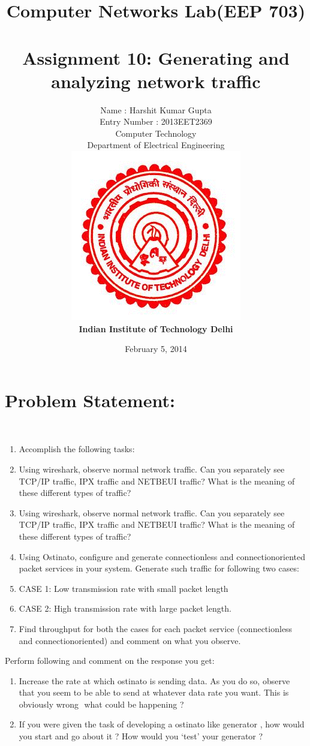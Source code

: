 \documentclass[a4paper,12pt,oneside]{article}
\title{\bf \LARGE {Computer Networks Lab(EEP 703)\\
\\[0.5cm]  Assignment 10: Generating and analyzing network traffic}}
\author{Name : Harshit Kumar Gupta \\Entry Number : 2013EET2369
\\[0.5cm]Computer Technology \\Department of Electrical Engineering
\\[0.5cm]\includegraphics[scale=.5]{./IITD.png}
\\[2cm]\bf \LARGE{Indian Institute of Technology Delhi}}
\date{February 5, 2014}
\begin{document}
\maketitle
\newpage
\tableofcontents






\newpage

 \section{Problem Statement:}


\\[.25cm]
\begin{enumerate}
\item Accomplish the following tasks:
\item Using wireshark, observe normal network traffic. Can you separately see TCP/IP traffic, 
IPX traffic and NETBEUI traffic? What is the meaning of these different types of traffic? 
\item Using wireshark, observe normal network traffic. Can you separately see TCP/IP traffic, 
IPX traffic and NETBEUI traffic? What is the meaning of these different types of traffic? 
\item Using Ostinato, configure and generate connectionless and connection­oriented packet services 
in your system. Generate such traffic for following two cases: 
\item CASE 1: Low transmission rate with small packet length  
\item CASE 2: High transmission rate with large packet length.
\item Find throughput for both the cases for each packet service (connectionless and 
connection­oriented) and comment on what you observe.
\end{enumerate}
Perform following and comment on the response you get:
\begin{enumerate}
\item Increase the rate at which ostinato is sending data. As you do so, observe that you seem 
to be able to send at whatever data rate you want. This is obviously wrong ­ what could 
be happening ?  

\item If you were given the task of developing a ostinato like generator , how would you start 
and go about it ? How would you ‘test’ your generator ?
\end{enumerate}
\end{document}
